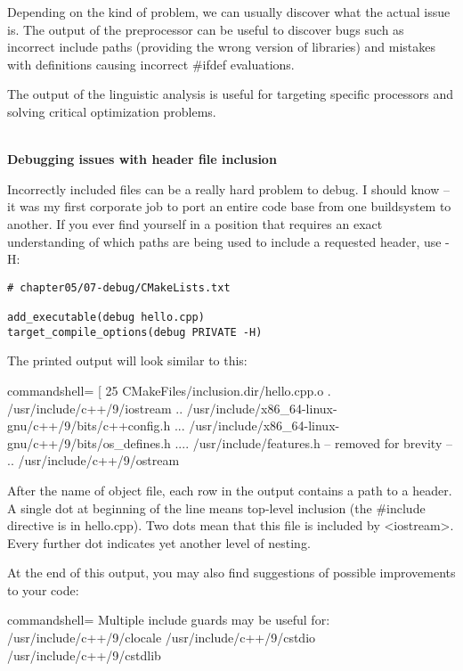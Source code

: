 Depending on the kind of problem, we can usually discover what the actual issue is. The output of the preprocessor can be useful to discover bugs such as incorrect include paths (providing the wrong version of libraries) and mistakes with definitions causing incorrect \#ifdef evaluations.

The output of the linguistic analysis is useful for targeting specific processors and solving critical optimization problems.

\hspace*{\fill} \\ %
\noindent
\textbf{Debugging issues with header file inclusion}

Incorrectly included files can be a really hard problem to debug. I should know – it was my first corporate job to port an entire code base from one buildsystem to another. If you ever find yourself in a position that requires an exact understanding of which paths are being used to include a requested header, use -H:

\begin{lstlisting}[style=styleCMake]
# chapter05/07-debug/CMakeLists.txt

add_executable(debug hello.cpp)
target_compile_options(debug PRIVATE -H)
\end{lstlisting}

The printed output will look similar to this:

\begin{tcblisting}{commandshell={}}
[ 25%
CMakeFiles/inclusion.dir/hello.cpp.o
. /usr/include/c++/9/iostream
.. /usr/include/x86_64-linux-gnu/c++/9/bits/c++config.h
... /usr/include/x86_64-linux-gnu/c++/9/bits/os_defines.h
.... /usr/include/features.h
-- removed for brevity --
.. /usr/include/c++/9/ostream
\end{tcblisting}

After the name of object file, each row in the output contains a path to a header. A single dot at beginning of the line means top-level inclusion (the \#include directive is in hello.cpp). Two dots mean that this file is included by <iostream>. Every further dot indicates yet another level of nesting.

At the end of this output, you may also find suggestions of possible improvements to your code:

\begin{tcblisting}{commandshell={}}
Multiple include guards may be useful for:
/usr/include/c++/9/clocale
/usr/include/c++/9/cstdio
/usr/include/c++/9/cstdlib
\end{tcblisting}

